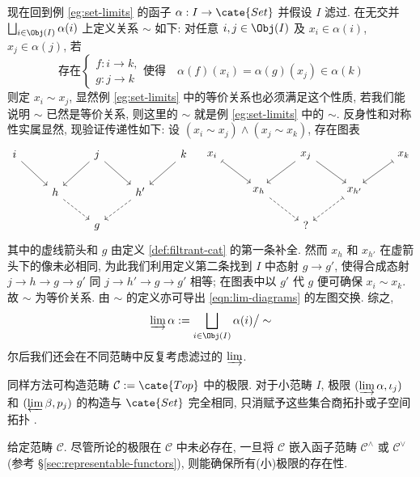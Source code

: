 现在回到例 \ref{eg:set-limits} 的函子 $\alpha: I \to \cate{Set}$ 并假设 $I$ 滤过. 在无交并 $\bigsqcup_{i \in \Obj(I)} \alpha(i)$ 上定义关系 $\sim$ 如下: 对任意 $i, j \in \Obj(I)$ 及 $x_i \in \alpha(i)$, $x_j \in \alpha(j)$, 若
\begin{equation}\label{eqn:filtrant-equiv} \text{存在} \begin{cases}
	f: i \to k, \\
	g: j \to k
	\end{cases}
	\text{使得} \quad \alpha(f)(x_i) = \alpha(g)(x_j) \in \alpha(k)
\end{equation}
则定 $x_i \sim x_j$, 显然例 \ref{eg:set-limits} 中的等价关系也必须满足这个性质, 若我们能说明 $\sim$ 已然是等价关系, 则这里的 $\sim$ 就是例 \ref{eg:set-limits} 中的 $\sim$. 反身性和对称性实属显然, 现验证传递性如下: 设 $(x_i \sim x_j) \wedge (x_j \sim x_k)$, 存在图表
\[ \begin{tikzcd}[scale=0.75]
	i \arrow[rd] & & j \arrow[ld] \arrow[rd] & & k \arrow[ld] \\
	& h \arrow[dashed, rd] & & h' \arrow[dashed, ld] & \\
	& & g & &
\end{tikzcd} \quad \begin{tikzcd}[scale=0.75]
	x_i \arrow[mapsto, rd] & & x_j \arrow[ld] \arrow[rd] & & x_k \arrow[mapsto, ld] \\
	& x_h \arrow[dashed, rd] & & x_{h'} \arrow[dashed, mapsto, ld] & \\
	& & ? & & 
\end{tikzcd} \]
其中的虚线箭头和 $g$ 由定义 \ref{def:filtrant-cat} 的第一条补全. 然而 $x_h$ 和 $x_{h'}$ 在虚箭头下的像未必相同, 为此我们利用定义第二条找到 $I$ 中态射 $g \to g'$, 使得合成态射 $j \to h \to g \to g'$ 同 $j \to h' \to g \to g'$ 相等; 在图表中以 $g'$ 代 $g$ 便可确保 $x_i \sim x_k$. 故 $\sim$ 为等价关系. 由 $\sim$ 的定义亦可导出 \eqref{eqn:lim-diagrams} 的左图交换. 综之,
\[ \varinjlim \alpha := \bigsqcup_{i \in \Obj(I)} \alpha(i) \big/ \sim \]
尔后我们还会在不同范畴中反复考虑滤过的 $\varinjlim$.

\begin{example}\label{eg:top-limits}
	同样方法可构造范畴 $\mathcal{C} := \cate{Top}$ 中的极限. 对于小范畴 $I$, 极限 $(\varinjlim \alpha, \iota_j)$ 和 $(\varprojlim \beta, p_j)$ 的构造与 $\cate{Set}$ 完全相同, 只消赋予这些集合商拓扑或子空间拓扑 \cite[\S 3.1, \S 3.4]{Xiong}.
\end{example}

给定范畴 $\mathcal{C}$. 尽管所论的极限在 $\mathcal{C}$ 中未必存在, 一旦将 $\mathcal{C}$ 嵌入函子范畴 $\mathcal{C}^\wedge$ 或 $\mathcal{C}^\vee$ (参考 \S\ref{sec:representable-functors}), 则能确保所有(小)极限的存在性.


